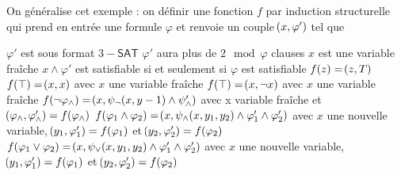 \documentclass[a4paper,french,bookmarks]{book}
\newcommand{\SAT}{\textsf{SAT}}
\begin{document}
    On généralise cet exemple : on définir une fonction $f$ par induction structurelle qui prend en entrée une formule $\varphi$ et renvoie un couple $\!\left(x, \varphi'\right)$ tel que \begin{enumerate}
        \itt $\varphi'$ est sous format $3-\SAT$
        \itt $\varphi'$ aura plus de $2\mod \varphi$ clauses
        \itt $x$ est une variable fraîche
        \itt $x \land \varphi'$ est satisfiable si et seulement si $\varphi$ est satisfiable
        \itt $f\!\left(z\right) = \!\left(z, T\right)$
        \itt $f\!\left(\top\right) = \!\left(x, x\right)$ avec $x$ une variable fraîche
        \itt $f\!\left(\top\right) = \!\left(x, \neg x\right)$ avec $x$ une variable fraîche
        \itt $f\!\left(\neg \varphi_\land\right) = \!\left(x, \psi_\neg \!\left(x, y-1\right) \land \psi_\land'\right)$ avec x variable fraîche et $\!\left(\varphi_\land, \varphi_\land'\right) = f\!\left(\varphi_\land\right)$
        \itt $f \!\left(\varphi_1 \land \varphi_2\right) = \!\left(x, \psi_\land \!\left(x, y_1, y_2\right) \land \varphi_1' \land \varphi_2'\right)$ avec $x$ une nouvelle variable, $\!\left(y_1, \varphi_1'\right) = f\!\left(\varphi_1\right)$ et $\!\left(y_2, \varphi_2'\right) = f\!\left(\varphi_2\right)$
        \itt $f \!\left(\varphi_1 \lor \varphi_2\right) = \!\left(x, \psi_\lor \!\left(x, y_1, y_2\right) \land \varphi_1' \land \varphi_2'\right)$ avec $x$ une nouvelle variable, $\!\left(y_1, \varphi_1'\right) = f\!\left(\varphi_1\right)$ et $\!\left(y_2, \varphi_2'\right) = f\!\left(\varphi_2\right)$
    \end{enumerate}
        
\end{document}
